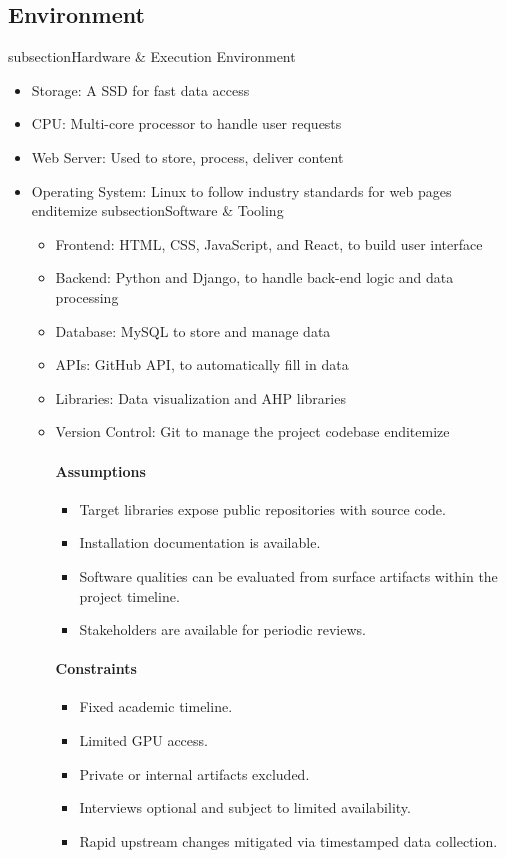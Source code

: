 \documentclass{article}
\begin{document}
\subsection{Environment}
subsection{Hardware & Execution Environment}
\begin{itemize}
    \item Storage: A SSD for fast data access
    \item CPU: Multi-core processor to handle user requests
    \item Web Server: Used to store, process, deliver content
    \item Operating System: Linux to follow industry standards for web pages
end{itemize}
subsection{Software & Tooling}
\begin{itemize}
    \item Frontend: HTML, CSS, JavaScript, and React, to build user interface
    \item Backend: Python and Django, to handle back-end logic and data processing
    \item Database: MySQL to store and manage data
    \item APIs: GitHub API, to automatically fill in data
    \item Libraries: Data visualization and AHP libraries
    \item Version Control: Git to manage the project codebase
end{itemize}

\paragraph{Assumptions}
\begin{itemize}
  \item Target libraries expose public repositories with source code.
  \item Installation documentation is available.
  \item Software qualities can be evaluated from surface artifacts within the project timeline.
  \item Stakeholders are available for periodic reviews.
\end{itemize}

\paragraph{Constraints}
\begin{itemize}
  \item Fixed academic timeline.
  \item Limited GPU access.
  \item Private or internal artifacts excluded.
  \item Interviews optional and subject to limited availability.
  \item Rapid upstream changes mitigated via timestamped data collection.
\end{itemize}


\end{itemize}
\end{itemize}
\end{document}
